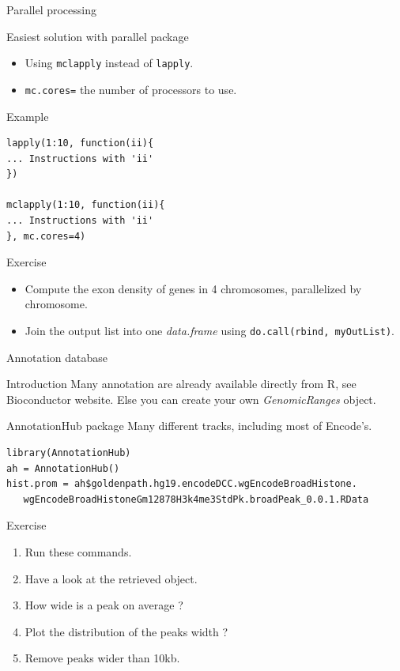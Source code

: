 \documentclass[10pt]{beamer}
\newcommand{\df}{{\it data.frame} }
\begin{document}
\begin{frame}[fragile]{Parallel processing}
  \begin{block}{Easiest solution with {\sf parallel} package}
    \begin{itemize}
    \item Using \verb!mclapply! instead of \verb!lapply!.
    \item \verb!mc.cores=! the number of processors to use.
    \end{itemize}
  \end{block}
  \begin{exampleblock}{Example}
\begin{verbatim}
lapply(1:10, function(ii){
... Instructions with 'ii'
})

mclapply(1:10, function(ii){
... Instructions with 'ii'
}, mc.cores=4)
\end{verbatim}
  \end{exampleblock}
  \begin{alertblock}{Exercise}
    \begin{itemize}
    \item Compute the exon density of genes in 4 chromosomes, parallelized by chromosome.
    \item Join the output list into one \df using \verb!do.call(rbind, myOutList)!.
    \end{itemize}
  \end{alertblock}
\end{frame}

\begin{frame}[fragile, shrink=10]{Annotation database}
  \begin{block}{Introduction}
    Many annotation are already available directly from R, see Bioconductor website. Else you can create your own {\it GenomicRanges} object.
  \end{block}
  \begin{block}{{\sf AnnotationHub} package}
    Many different tracks, including most of Encode's.
\begin{verbatim}
library(AnnotationHub)
ah = AnnotationHub()
hist.prom = ah$goldenpath.hg19.encodeDCC.wgEncodeBroadHistone.
   wgEncodeBroadHistoneGm12878H3k4me3StdPk.broadPeak_0.0.1.RData
\end{verbatim}      
  \end{block}
  \begin{block}{Exercise}
    \begin{enumerate}
    \item Run these commands.
    \item Have a look at the retrieved object.
    \item How wide is a peak on average ? 
    \item Plot the distribution of the peaks width ?
    \item Remove peaks wider than 10kb.
    \end{enumerate}
  \end{block}
\end{frame}
\end{document}

